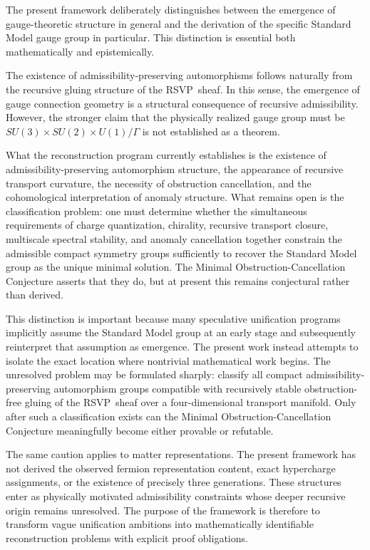 \documentclass[12pt,a4paper]{article}
\newcommand{\RSVP}{\textrm{RSVP}}
\begin{document}
The present framework deliberately distinguishes between the emergence of
gauge-theoretic structure in general and the derivation of the specific
Standard Model gauge group in particular. This distinction is essential both
mathematically and epistemically.

The existence of admissibility-preserving automorphisms follows naturally from
the recursive gluing structure of the \RSVP\ sheaf. In this sense, the
emergence of gauge connection geometry is a structural consequence of recursive
admissibility. However, the stronger claim that the physically realized gauge
group must be $SU(3)\times SU(2)\times U(1)/\Gamma$ is not established as a
theorem.

What the reconstruction program currently establishes is the existence of
admissibility-preserving automorphism structure, the appearance of recursive
transport curvature, the necessity of obstruction cancellation, and the
cohomological interpretation of anomaly structure. What remains open is the
classification problem: one must determine whether the simultaneous requirements
of charge quantization, chirality, recursive transport closure, multiscale
spectral stability, and anomaly cancellation together constrain the admissible
compact symmetry groups sufficiently to recover the Standard Model group as the
unique minimal solution. The Minimal Obstruction-Cancellation Conjecture asserts
that they do, but at present this remains conjectural rather than derived.

This distinction is important because many speculative unification programs
implicitly assume the Standard Model group at an early stage and subsequently
reinterpret that assumption as emergence. The present work instead attempts to
isolate the exact location where nontrivial mathematical work begins. The
unresolved problem may be formulated sharply: classify all compact
admissibility-preserving automorphism groups compatible with recursively stable
obstruction-free gluing of the \RSVP\ sheaf over a four-dimensional transport
manifold. Only after such a classification exists can the Minimal
Obstruction-Cancellation Conjecture meaningfully become either provable or
refutable.

The same caution applies to matter representations. The present framework has
not derived the observed fermion representation content, exact hypercharge
assignments, or the existence of precisely three generations. These structures
enter as physically motivated admissibility constraints whose deeper recursive
origin remains unresolved. The purpose of the framework is therefore to
transform vague unification ambitions into mathematically identifiable
reconstruction problems with explicit proof obligations.
\end{document}
